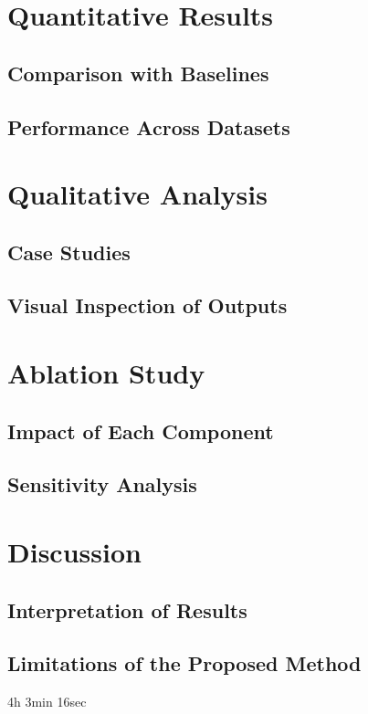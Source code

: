 \section{Quantitative Results}
\label{sec:quantitative-results}

    \subsection{Comparison with Baselines}
    \label{subsec:baseline-comparison}

    \subsection{Performance Across Datasets}
    \label{subsec:dataset-performance}

\section{Qualitative Analysis}
\label{sec:qualitative-analysis}

    \subsection{Case Studies}
    \label{subsec:case-studies}

    \subsection{Visual Inspection of Outputs}
    \label{subsec:visual-inspection}

\section{Ablation Study}
\label{sec:ablation}

    \subsection{Impact of Each Component}
    \label{subsec:component-impact}

    \subsection{Sensitivity Analysis}
    \label{subsec:sensitivity}

\section{Discussion}
\label{sec:discussion}

    \subsection{Interpretation of Results}
    \label{subsec:interpretation}

    \subsection{Limitations of the Proposed Method}
    \label{subsec:limitations}


4h 3min 16sec